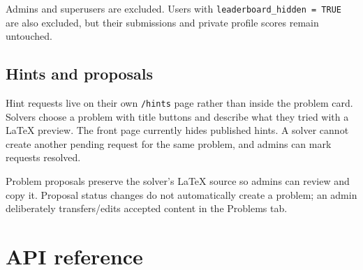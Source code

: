 \documentclass[11pt,oneside]{book}
\newcommand{\route}[1]{\texttt{#1}}
\newcommand{\code}[1]{\texttt{#1}}
\begin{document}
Admins and superusers are excluded. Users with \code{leaderboard\_hidden = TRUE} are also excluded, but their submissions and private profile scores remain untouched.

\section{Hints and proposals}
Hint requests live on their own \route{/hints} page rather than inside the problem card. Solvers choose a problem with title buttons and describe what they tried with a LaTeX preview. The front page currently hides published hints. A solver cannot create another pending request for the same problem, and admins can mark requests resolved.

Problem proposals preserve the solver's LaTeX source so admins can review and copy it. Proposal status changes do not automatically create a problem; an admin deliberately transfers/edits accepted content in the Problems tab.

\chapter{API reference}
\end{document}
